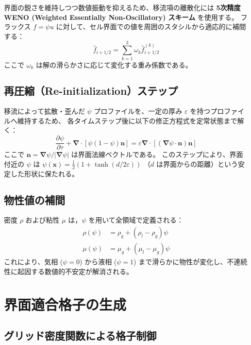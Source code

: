 \documentclass[12pt, a4paper, titlepage, xelatex, ja=standard]{bxjsarticle}
\newcommand{\pd}[2]{\dfrac{\partial #1}{\partial #2}}
\newcommand{\bnabla}{\bm{\nabla}}
\begin{document}
界面の鋭さを維持しつつ数値振動を抑えるため、移流項の離散化には \textbf{5次精度 WENO (Weighted Essentially Non-Oscillatory) スキーム} を使用する。
フラックス $f = \psi u$ に対して、セル界面での値を周囲のスタシルから適応的に補間する：
\begin{equation}
  \hat{f}_{i+1/2} = \sum_{k=1}^3 \omega_k \hat{f}^{(k)}_{i+1/2}
\end{equation}
ここで $\omega_k$ は解の滑らかさに応じて変化する重み係数である。

\subsection{再圧縮（Re-initialization）ステップ}

移流によって拡散・歪んだ $\psi$ プロファイルを、一定の厚み $\varepsilon$ を持つプロファイルへ維持するため、
各タイムステップ後に以下の修正方程式を定常状態まで解く：
\begin{equation}
  \pd{\psi}{\tau} + \bnabla \cdot [ \psi(1-\psi) \bm{n} ] = \varepsilon \bnabla \cdot [ (\bnabla \psi \cdot \bm{n}) \bm{n} ]
\end{equation}
ここで $\bm{n} = \bnabla \psi / |\bnabla \psi|$ は界面法線ベクトルである。
このステップにより、界面付近の $\psi$ は $\psi(\bm{x}) = \frac{1}{2}(1 + \tanh(d/2\varepsilon))$ 
（$d$ は界面からの距離）という安定した形状に保たれる。

\subsection{物性値の補間}

密度 $\rho$ および粘性 $\mu$ は，$\psi$ を用いて全領域で定義される：
\begin{align}
  \rho(\psi) &= \rho_g + (\rho_l - \rho_g)\psi \\
  \mu(\psi)  &= \mu_g + (\mu_l - \mu_g)\psi
\end{align}
これにより、気相 ($\psi=0$) から液相 ($\psi=1$) まで滑らかに物性が変化し、不連続性に起因する数値的不安定が解消される。


\section{界面適合格子の生成}
\label{sec:grid}

\subsection{グリッド密度関数による格子制御}
\end{document}
